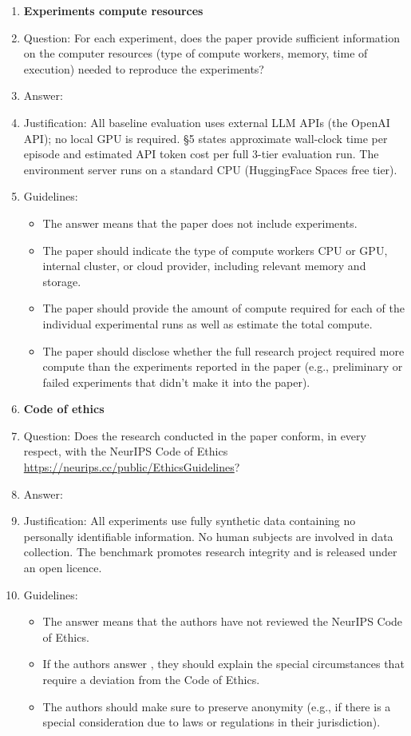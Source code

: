 \begin{enumerate}
\item {\bf Experiments compute resources}
    \item[] Question: For each experiment, does the paper provide sufficient information on the computer resources (type of compute workers, memory, time of execution) needed to reproduce the experiments?
    \item[] Answer: \answerYes{}
    \item[] Justification: All baseline evaluation uses external LLM APIs (the OpenAI API); no local GPU is required. \S5 states approximate wall-clock time per episode and estimated API token cost per full 3-tier evaluation run. The environment server runs on a standard CPU (HuggingFace Spaces free tier).
    \item[] Guidelines: \begin{itemize}
        \item The answer \answerNA{} means that the paper does not include experiments.
        \item The paper should indicate the type of compute workers CPU or GPU, internal cluster, or cloud provider, including relevant memory and storage.
        \item The paper should provide the amount of compute required for each of the individual experimental runs as well as estimate the total compute.
        \item The paper should disclose whether the full research project required more compute than the experiments reported in the paper (e.g., preliminary or failed experiments that didn't make it into the paper).
    \end{itemize}

\item {\bf Code of ethics}
    \item[] Question: Does the research conducted in the paper conform, in every respect, with the NeurIPS Code of Ethics \url{https://neurips.cc/public/EthicsGuidelines}?
    \item[] Answer: \answerYes{}
    \item[] Justification: All experiments use fully synthetic data containing no personally identifiable information. No human subjects are involved in data collection. The benchmark promotes research integrity and is released under an open licence.
    \item[] Guidelines: \begin{itemize}
        \item The answer \answerNA{} means that the authors have not reviewed the NeurIPS Code of Ethics.
        \item If the authors answer \answerNo, they should explain the special circumstances that require a deviation from the Code of Ethics.
        \item The authors should make sure to preserve anonymity (e.g., if there is a special consideration due to laws or regulations in their jurisdiction).
    \end{itemize}



\end{enumerate}
